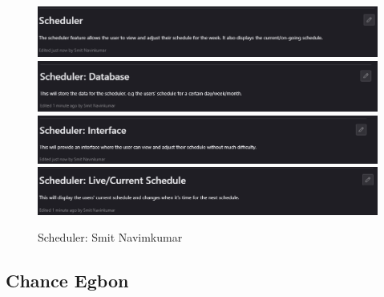 \documentclass[a4paper]{article}
\begin{document}
\begin{figure}[H]
	\centering
	\includegraphics[width=1\textwidth]{./images/Scheduler.png}
	\includegraphics[width=1\textwidth]{./images/Scheduler_Database.png}
	\includegraphics[width=1\textwidth]{./images/Scheduler_Interface.png}
	\includegraphics[width=1\textwidth]{./images/Scheduler_Live.png}
	\caption*{Scheduler: Smit Navimkumar}
	\label{Fig.Scheduler}
\end{figure}

\subsection{Chance Egbon}
\end{document}
